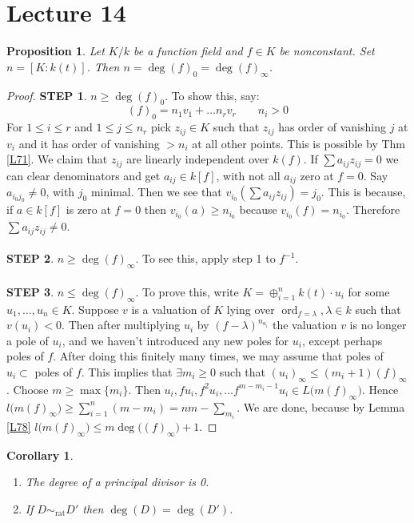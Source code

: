 \documentclass{article}
\DeclareMathOperator{\ord}{ord}
\theoremstyle{plain}
\newtheorem{cor}[thm]{Corollary}
\newtheorem{prop}[thm]{Proposition}
\theoremstyle{definition}
\theoremstyle{remark}
\begin{document}
\section*{Lecture 14}
\begin{prop}
\label{L80}
Let $K/k$ be a function field and $f\in K$ be nonconstant. Set $n = [K:k(t)]$. Then $n = \deg(f)_0 = \deg(f)_{\infty}$.
\end{prop}
\begin{proof}
\textbf{STEP 1}. $n\geq \deg(f)_0$. To show this, say:
\[       (f)_0 = n_1v_1 + \dots n_r v_r \;\;\;\;\;\;\; n_i>0      \]
For $1\leq i \leq r$ and $1\leq j \leq n_r$ pick $z_{ij} \in K$ such that $z_{ij}$ has order of vanishing $j$ at $v_i$ and it has order of vanishing $>n_i$ at all other points. This is possible by Thm \ref{L71}. We claim that $z_{ij}$ are linearly independent over $k(f)$. If $\sum a_{ij} z_{ij} = 0$ we can clear denominators and get $a_{ij} \in k[f]$, with not all $a_{ij}$ zero at $f=0$. Say $a_{i_0j_0} \neq 0$, with $j_0$ minimal. Then we see that $v_{i_0}(\sum a_{ij}z_{ij}) = j_0$. This is because, if $a\in k[f]$ is zero at $f=0$ then $v_{i_0}(a)\geq n_{i_0}$ because $v_{i_0}(f) = n_{i_0}$. Therefore $\sum a_{ij} z_{ij} \neq 0$.
\\
\\
\textbf{STEP 2}. $n\geq \deg(f)_{\infty}$. To see this, apply step 1 to $f^{-1}$.
\\
\\
\textbf{STEP 3}. $n\leq \deg(f)_{\infty}$. To prove this, write $K = \oplus_{i=1}^n k(t) \cdot u_i$ for some $u_1, \dots, u_n \in K$. Suppose $v$ is a valuation of $K$ lying over $\ord_{f=\lambda} , \lambda \in k$ such that $v(u_i)<0$. Then after multiplying $u_i$ by $(f-\lambda)^{n_{u_i}}$ the valuation $v$ is no longer a pole of $u_i$, and we haven't introduced any new poles for $u_i$, except perhaps poles of $f$. After doing this finitely many times, we may assume that poles of $u_i \subset$ poles of $f$. This implies that $\exists m_i\geq 0$ such that $(u_i)_\infty \leq (m_i + 1)(f)_{\infty}$. Choose $m\geq \max \{m_i\}$. Then $u_i, fu_i, f^2u_i, \dots f^{m-m_i -1}u_i \in L\big(m(f)_{\infty}\big)$. Hence $l\big(  m(f)_{\infty} \big) \geq \sum_{i=1}^n (m-m_i) = nm - \sum_{m_i}$. We are done, because by Lemma \ref{L78} $l\big(  m(f)_{\infty} \big) \leq m \deg\big((f)_{\infty}) +1$.
\end{proof}

\begin{cor}
\hspace{1mm}
\label{L81} 
\begin{enumerate}
\item {}The degree of a principal divisor is 0.
\item If $D\sim_{\text{rat}} D'$ then $\deg(D) = \deg(D')$.
\end{enumerate}
\end{cor}
\end{document}
